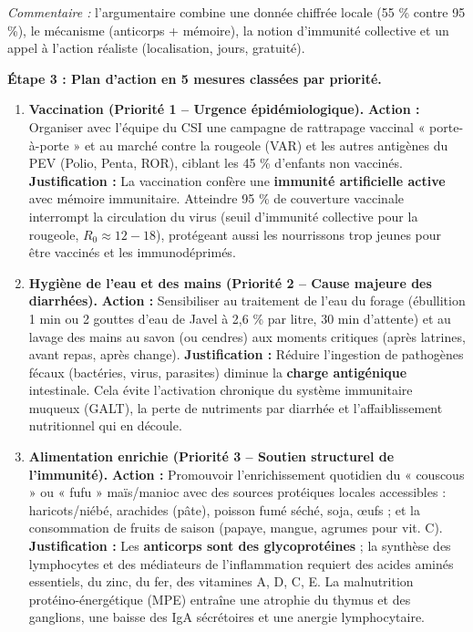 \documentclass[11pt]{article}
\begin{document}
\begin{exoresolu}
\emph{Commentaire :} l'argumentaire combine une donnée chiffrée locale (55 \% contre 95 \%), le mécanisme (anticorps + mémoire), la notion d'immunité collective et un appel à l'action réaliste (localisation, jours, gratuité).

\textbf{Étape 3 : Plan d'action en 5 mesures classées par priorité.}

\begin{enumerate}
\item \textbf{Vaccination (Priorité 1 -- Urgence épidémiologique).} \textbf{Action :} Organiser avec l'équipe du CSI une campagne de rattrapage vaccinal « porte-à-porte » et au marché contre la rougeole (VAR) et les autres antigènes du PEV (Polio, Penta, ROR), ciblant les 45 \% d'enfants non vaccinés. \textbf{Justification :} La vaccination confère une \textbf{immunité artificielle active} avec mémoire immunitaire. Atteindre 95 \% de couverture vaccinale interrompt la circulation du virus (seuil d'immunité collective pour la rougeole, $R_0 \approx 12-18$), protégeant aussi les nourrissons trop jeunes pour être vaccinés et les immunodéprimés.
\item \textbf{Hygiène de l'eau et des mains (Priorité 2 -- Cause majeure des diarrhées).} \textbf{Action :} Sensibiliser au traitement de l'eau du forage (ébullition 1 min ou 2 gouttes d'eau de Javel à 2,6 \% par litre, 30 min d'attente) et au lavage des mains au savon (ou cendres) aux moments critiques (après latrines, avant repas, après change). \textbf{Justification :} Réduire l'ingestion de pathogènes fécaux (bactéries, virus, parasites) diminue la \textbf{charge antigénique} intestinale. Cela évite l'activation chronique du système immunitaire muqueux (GALT), la perte de nutriments par diarrhée et l'affaiblissement nutritionnel qui en découle.
\item \textbf{Alimentation enrichie (Priorité 3 -- Soutien structurel de l'immunité).} \textbf{Action :} Promouvoir l'enrichissement quotidien du « couscous » ou « fufu » maïs/manioc avec des sources protéiques locales accessibles : haricots/niébé, arachides (pâte), poisson fumé séché, soja, œufs ; et la consommation de fruits de saison (papaye, mangue, agrumes pour vit. C). \textbf{Justification :} Les \textbf{anticorps sont des glycoprotéines} ; la synthèse des lymphocytes et des médiateurs de l'inflammation requiert des acides aminés essentiels, du zinc, du fer, des vitamines A, D, C, E. La malnutrition protéino-énergétique (MPE) entraîne une atrophie du thymus et des ganglions, une baisse des IgA sécrétoires et une anergie lymphocytaire.

\end{enumerate}
\end{exoresolu}
\end{document}
